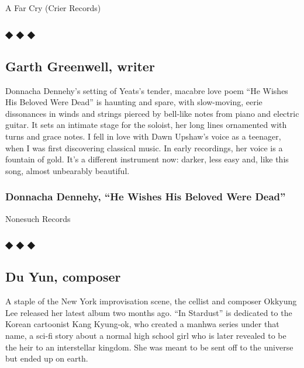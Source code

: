 A Far Cry (Crier Records)

\hypertarget{---8}{%
\subsubsection{◆ ◆ ◆}\label{---8}}

\hypertarget{garth-greenwell-writer}{%
\subsection{Garth Greenwell, writer}\label{garth-greenwell-writer}}

Donnacha Dennehy's setting of Yeats's tender, macabre love poem ``He
Wishes His Beloved Were Dead'' is haunting and spare, with slow-moving,
eerie dissonances in winds and strings pierced by bell-like notes from
piano and electric guitar. It sets an intimate stage for the soloist,
her long lines ornamented with turns and grace notes. I fell in love
with Dawn Upshaw's voice as a teenager, when I was first discovering
classical music. In early recordings, her voice is a fountain of gold.
It's a different instrument now: darker, less easy and, like this song,
almost unbearably beautiful.

\hypertarget{donnacha-dennehy-he-wishes-his-beloved-were-dead}{%
\subsubsection{Donnacha Dennehy, ``He Wishes His Beloved Were
Dead''}\label{donnacha-dennehy-he-wishes-his-beloved-were-dead}}

Nonesuch Records

\hypertarget{---9}{%
\subsubsection{◆ ◆ ◆}\label{---9}}

\hypertarget{du-yun-composer}{%
\subsection{Du Yun, composer}\label{du-yun-composer}}

A staple of the New York improvisation scene, the cellist and composer
Okkyung Lee released her latest album two months ago. ``In Stardust'' is
dedicated to the Korean cartoonist Kang Kyung-ok, who created a manhwa
series under that name, a sci-fi story about a normal high school girl
who is later revealed to be the heir to an interstellar kingdom. She was
meant to be sent off to the universe but ended up on earth.

